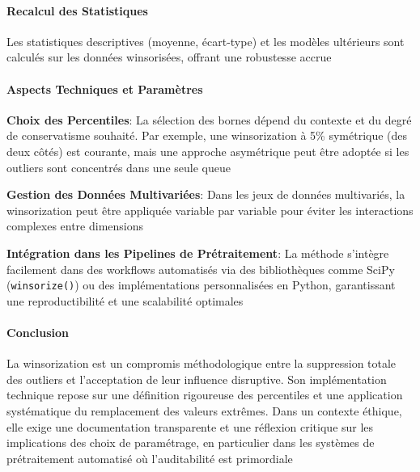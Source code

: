 \documentclass{article}
\begin{document}
\paragraph*{Recalcul des Statistiques}
Les statistiques descriptives (moyenne, écart-type) et les modèles ultérieurs sont calculés sur les données winsorisées, offrant une robustesse accrue \cite{dasca, magnimind}

\paragraph*{Aspects Techniques et Paramètres}
\textbf{Choix des Percentiles}: 
La sélection des bornes dépend du contexte et du degré de conservatisme souhaité. Par exemple, une winsorization à 5\% symétrique (des deux côtés) est courante, mais une approche asymétrique peut être adoptée si les outliers sont concentrés dans une seule queue \cite{amplitude, datacamp}

\textbf{Gestion des Données Multivariées}: 
Dans les jeux de données multivariés, la winsorization peut être appliquée variable par variable pour éviter les interactions complexes entre dimensions \cite{amplitude, datacamp}

\textbf{Intégration dans les Pipelines de Prétraitement}: 
La méthode s'intègre facilement dans des workflows automatisés via des bibliothèques comme SciPy (\texttt{winsorize()}) ou des implémentations personnalisées en Python, garantissant une reproductibilité et une scalabilité optimales \cite{datacamp, wikipedia}

\paragraph*{Conclusion}
La winsorization est un compromis méthodologique entre la suppression totale des outliers et l'acceptation de leur influence disruptive. Son implémentation technique repose sur une définition rigoureuse des percentiles et une application systématique du remplacement des valeurs extrêmes. Dans un contexte éthique, elle exige une documentation transparente et une réflexion critique sur les implications des choix de paramétrage, en particulier dans les systèmes de prétraitement automatisé où l'auditabilité est primordiale \cite{investopedia, dasca, wikipedia}



\end{document}
